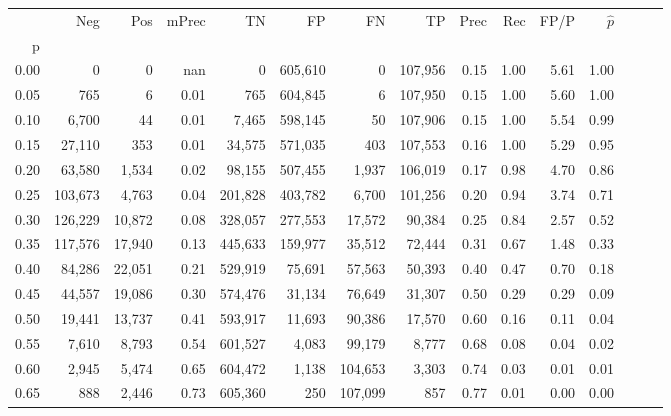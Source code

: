 \begin{tabular}{rrrrrrrrrrrrrrr}
\toprule
{} &      Neg &     Pos & mPrec &       TN &       FP &       FN &       TP &  Prec &   Rec &  FP/P & $\hat{p}$ \\
p    &          &         &       &          &          &          &          &       &       &       &           \\
\midrule
0.00 &        0 &       0 &   nan &        0 &  605,610 &        0 &  107,956 &  0.15 &  1.00 &  5.61 &      1.00 \\
0.05 &      765 &       6 &  0.01 &      765 &  604,845 &        6 &  107,950 &  0.15 &  1.00 &  5.60 &      1.00 \\
0.10 &    6,700 &      44 &  0.01 &    7,465 &  598,145 &       50 &  107,906 &  0.15 &  1.00 &  5.54 &      0.99 \\
0.15 &   27,110 &     353 &  0.01 &   34,575 &  571,035 &      403 &  107,553 &  0.16 &  1.00 &  5.29 &      0.95 \\
0.20 &   63,580 &   1,534 &  0.02 &   98,155 &  507,455 &    1,937 &  106,019 &  0.17 &  0.98 &  4.70 &      0.86 \\
0.25 &  103,673 &   4,763 &  0.04 &  201,828 &  403,782 &    6,700 &  101,256 &  0.20 &  0.94 &  3.74 &      0.71 \\
0.30 &  126,229 &  10,872 &  0.08 &  328,057 &  277,553 &   17,572 &   90,384 &  0.25 &  0.84 &  2.57 &      0.52 \\
0.35 &  117,576 &  17,940 &  0.13 &  445,633 &  159,977 &   35,512 &   72,444 &  0.31 &  0.67 &  1.48 &      0.33 \\
0.40 &   84,286 &  22,051 &  0.21 &  529,919 &   75,691 &   57,563 &   50,393 &  0.40 &  0.47 &  0.70 &      0.18 \\
0.45 &   44,557 &  19,086 &  0.30 &  574,476 &   31,134 &   76,649 &   31,307 &  0.50 &  0.29 &  0.29 &      0.09 \\
0.50 &   19,441 &  13,737 &  0.41 &  593,917 &   11,693 &   90,386 &   17,570 &  0.60 &  0.16 &  0.11 &      0.04 \\
0.55 &    7,610 &   8,793 &  0.54 &  601,527 &    4,083 &   99,179 &    8,777 &  0.68 &  0.08 &  0.04 &      0.02 \\
0.60 &    2,945 &   5,474 &  0.65 &  604,472 &    1,138 &  104,653 &    3,303 &  0.74 &  0.03 &  0.01 &      0.01 \\
0.65 &      888 &   2,446 &  0.73 &  605,360 &      250 &  107,099 &      857 &  0.77 &  0.01 &  0.00 &      0.00 \\

\end{tabular}
